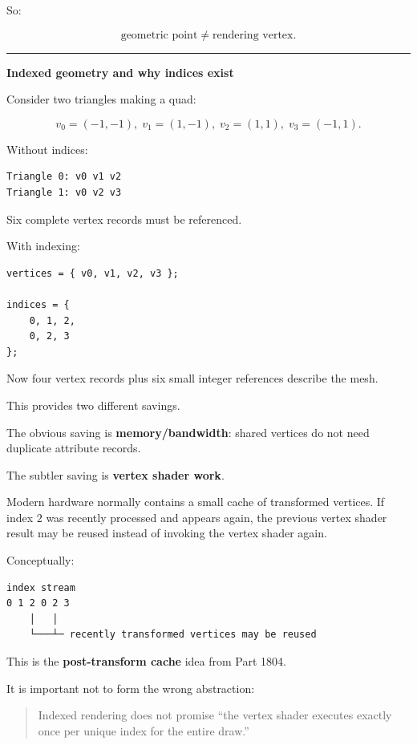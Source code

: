 So:

\[
\text{geometric point} \neq \text{rendering vertex}.
\]

\begin{center}\rule{0.5\linewidth}{0.5pt}\end{center}

\textbf{Indexed geometry and why indices exist}

Consider two triangles making a quad:

\[
v_0=(-1,-1),\;
v_1=(1,-1),\;
v_2=(1,1),\;
v_3=(-1,1).
\]

Without indices:

\begin{verbatim}
Triangle 0: v0 v1 v2
Triangle 1: v0 v2 v3
\end{verbatim}

Six complete vertex records must be referenced.

With indexing:

\begin{verbatim}
vertices = { v0, v1, v2, v3 };

indices = {
    0, 1, 2,
    0, 2, 3
};
\end{verbatim}

Now four vertex records plus six small integer references describe the mesh.

This provides two different savings.

The obvious saving is \textbf{memory/bandwidth}: shared vertices do not need duplicate attribute records.

The subtler saving is \textbf{vertex shader work}.

Modern hardware normally contains a small cache of transformed vertices. If index \(2\) was recently processed and appears again, the previous vertex shader result may be reused instead of invoking the vertex shader again.

Conceptually:

\begin{verbatim}
index stream
0 1 2 0 2 3
    │   │
    └───┴─ recently transformed vertices may be reused
\end{verbatim}

This is the \textbf{post-transform cache} idea from Part 1804.

It is important not to form the wrong abstraction:

\begin{quote}
Indexed rendering does not promise ``the vertex shader executes exactly once per unique index for the entire draw.''
\end{quote}

